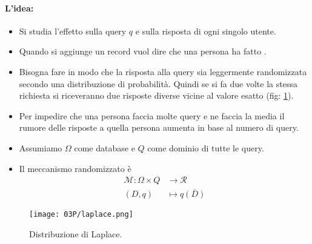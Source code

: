 \paragraph{L'idea:}

\begin{itemize}
  \item Si studia l'effetto sulla query $q$ e sulla risposta di ogni singolo utente. 
  \item Quando si aggiunge un record vuol dire che una persona ha fatto . 
  \item Bisogna fare in modo che la risposta alla query sia leggermente randomizzata secondo una distribuzione di probabilità. Quindi se si fa due volte la stessa richiesta si riceveranno due risposte diverse vicine al valore esatto (fig: \ref{fig:lp}).
  \item Per impedire che una persona faccia molte query e ne faccia la media il rumore delle risposte a quella persona aumenta in base al numero di query.
  \item Assumiamo $\Omega$ come database e $Q$ come dominio di tutte le query.
  \item Il meccanismo randomizzato è $$\begin{aligned}
\mathcal{M}: \Omega \times Q &\to \mathcal{R} \\
(D, q) &\mapsto q\overline{(D)}
\end{aligned}$$
\end{itemize}

\begin{figure}[h]
    \centering
    \texttt{[image: 03P/laplace.png]}
    \caption{Distribuzione di Laplace.}
    \label{fig:lp}
\end{figure}





